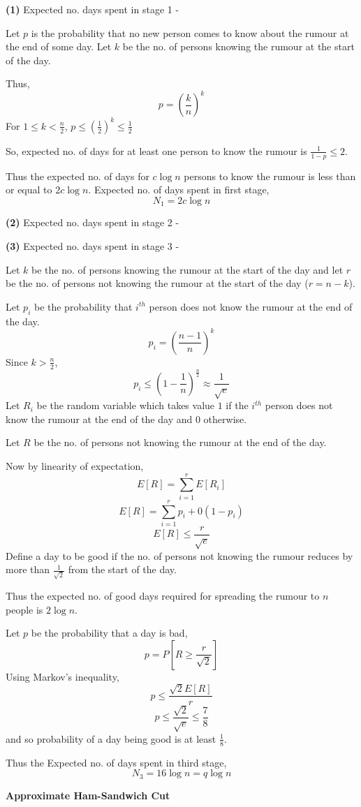 \documentclass[a4paper]{article}
\begin{document}
\textbf{(1)} Expected no. days spent in stage 1 - 

Let $p$ is the probability that no new person comes to know about the rumour at the end of some day. Let $k$ be the no. of persons knowing the rumour at the start of the day.

Thus,
$$p = \left(\frac{k}{n}\right)^k$$
For $1 \leq k < \frac{n}{2}$, $p \leq \left(\frac{1}{2}\right)^k \leq \frac{1}{2}$

So, expected no. of days for at least one person to know the rumour is $\frac{1}{1 - p} \leq 2$.

Thus the expected no. of days for $c\log n$ persons to know the rumour is less than or equal to $2c\log n$.
Expected no. of days spent in first stage, $$N_1 = 2c\log n$$

\textbf{(2)} Expected no. days spent in stage 2 - 



\textbf{(3)} Expected no. days spent in stage 3 - 

Let $k$ be the no. of persons knowing the rumour at the start of the day and let $r$ be the no. of persons not knowing the rumour at the start of the day ($r = n-k$).

Let $p_i$ be the probability that $i^{th}$ person does not know the rumour at the end of the day.
$$p_i = \left(\frac{n-1}{n}\right)^k$$
Since $k > \frac{n}{2}$,
$$p_i \leq \left(1 - \frac{1}{n}\right)^{\frac{n}{2}} \approx \frac{1}{\sqrt{e}}$$
Let $R_i$ be the random variable which takes value $1$ if the $i^{th}$ person does not know the rumour at the end of the day and $0$ otherwise.

Let $R$ be the no. of persons not knowing the rumour at the end of the day.

Now by linearity of expectation,
$$E[R] = \sum_{i=1}^r E[R_i]$$
$$E[R] = \sum_{i=1}^r p_i + 0(1- p_i)$$
$$E[R] \leq \frac{r}{\sqrt{e}}$$
Define a day to be good if the no. of persons not knowing the rumour reduces by more than $\frac{1}{\sqrt{2}}$ from the start of the day.

Thus the expected no. of good days required for spreading the rumour to $n$ people is $2\log n$.

Let $p$ be the probability that a day is bad,
$$p = P\left[R \geq \frac{r}{\sqrt{2}}\right]$$
Using Markov's inequality,
$$p \leq \frac{\sqrt{2}E[R]}{r}$$
$$p \leq \frac{\sqrt{2}}{\sqrt{e}} \leq \frac{7}{8}$$
and so probability of a day being good is at least $\frac{1}{8}$.

Thus the Expected no. of days spent in third stage, $$N_3 = 16\log n = q \log n$$

\pagebreak
\begin{question}[]
\textbf{Approximate Ham-Sandwich Cut}

\end{question}
\end{document}
